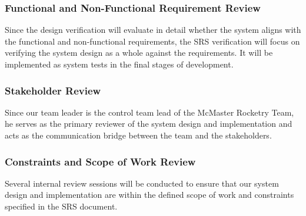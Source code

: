 \documentclass[12pt, titlepage]{article}
\begin{document}
\subsubsection{Functional and Non-Functional Requirement Review}
Since the design verification will evaluate in detail whether the system aligns
with the functional and non-functional requirements, the SRS verification will
focus on verifying the system design as a whole against the requirements. It
will be implemented as system tests in the final stages of development.

\subsubsection{Stakeholder Review}
Since our team leader is the control team lead of the McMaster Rocketry Team,
he serves as the primary reviewer of the system design and implementation and
acts as the communication bridge between the team and the stakeholders.

\subsubsection{Constraints and Scope of Work Review}
Several internal review sessions will be conducted to ensure that our system
design and implementation are within the defined scope of work and constraints
specified in the SRS document.
\end{document}
